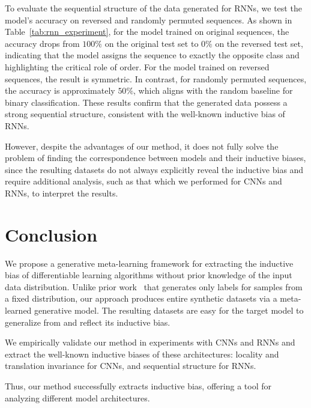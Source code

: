 \documentclass{article}
\begin{document}
To evaluate the sequential structure of the data generated for RNNs, we test the model's accuracy on reversed and randomly permuted sequences. As shown in Table~\ref{tab:rnn_experiment}, for the model trained on original sequences, the accuracy drops from $100\%$ on the original test set to $0\%$ on the reversed test set, indicating that the model assigns the sequence to exactly the opposite class and highlighting the critical role of order. For the model trained on reversed sequences, the result is symmetric. In contrast, for randomly permuted sequences, the accuracy is approximately $50\%$, which aligns with the random baseline for binary classification. These results confirm that the generated data possess a strong sequential structure, consistent with the well-known inductive bias of RNNs.

However, despite the advantages of our method, it does not fully solve the problem of finding the correspondence between models and their inductive biases, since the resulting datasets do not always explicitly reveal the inductive bias and require additional analysis, such as that which we performed for CNNs and RNNs, to interpret the results.

\fi

\section{Conclusion}\label{sec:concl}

We propose a generative meta-learning framework for extracting the inductive bias of differentiable learning algorithms without prior knowledge of the input data distribution. Unlike prior work~\cite{dorrell2023metalearninginductivebiasessimple} that generates only labels for samples from a fixed distribution, our approach produces entire synthetic datasets via a meta-learned generative model. The resulting datasets are easy for the target model to generalize from and reflect its inductive bias.

We empirically validate our method in experiments with CNNs and RNNs and extract the well-known inductive biases of these architectures: locality and translation invariance for CNNs, and sequential structure for RNNs.

Thus, our method successfully extracts inductive bias, offering a tool for analyzing different model architectures.

\end{document}
